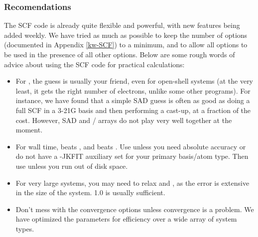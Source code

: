 \subsubsection{Recomendations}

The SCF code is already quite flexible and powerful, with new features being
added weekly. We have tried as much as possible to keep the number of options 
(documented in Appendix \ref{kw-SCF})
to a minimum, and to allow all options to be used in the presence of all other
options. Below are some rough words of advice about using the SCF code for
practical calculations:
\begin{itemize}
\item For , the  guess is usually your
friend, even for open-shell systems (at the very least, it gets the right number
of electrons, unlike some other programs). For instance, we have found that a
simple SAD guess is often as good as doing a full SCF in a 3-21G basis and then
performing a cast-up, at a fraction of the cost.  However, SAD and
/ arrays do not play very
well together at the moment. 
\item For wall time,  beats , and 
 beats
. Use  unless you need absolute accuracy or do not
have a -JKFIT auxiliary set for your primary basis/atom type. Then use
 unless you run out of disk space.
\item For very large systems, you may need to relax  and
, as the error is extensive in the size of the system.
1.0 is usually sufficient.  
\item Don't mess with the convergence options unless convergence is a problem.
We have optimized the parameters for efficiency over a wide array of system
types.  
\end{itemize} 
